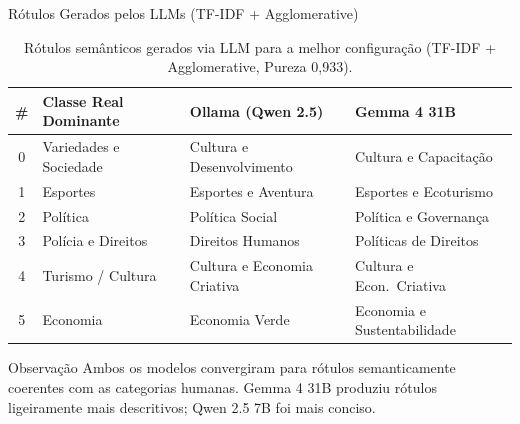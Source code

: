 \documentclass[aspectratio=169]{beamer}
\begin{document}
\begin{frame}{Rótulos Gerados pelos LLMs (TF-IDF + Agglomerative)}
  {\small
  \begin{table}
    \centering
    \setlength{\tabcolsep}{4pt}
    \renewcommand{\arraystretch}{1.2}
    \begin{tabular}{clll}
      \toprule
      \textbf{\#} & \textbf{Classe Real Dominante} &
      \textbf{Ollama (Qwen 2.5)} & \textbf{Gemma 4 31B}\\
      \midrule
      0 & Variedades e Sociedade & Cultura e Desenvolvimento   & Cultura e Capacitação\\
      1 & Esportes               & Esportes e Aventura          & Esportes e Ecoturismo\\
      2 & Política               & Política Social              & Política e Governança\\
      3 & Polícia e Direitos     & Direitos Humanos             & Políticas de Direitos\\
      4 & Turismo / Cultura      & Cultura e Economia Criativa  & Cultura e Econ.\ Criativa\\
      5 & Economia               & Economia Verde               & Economia e Sustentabilidade\\
      \bottomrule
    \end{tabular}
    \caption{\footnotesize Rótulos semânticos gerados via LLM para a melhor
             configuração (TF-IDF + Agglomerative, Pureza 0{,}933).}
  \end{table}
  }
  \vspace{-0.4em}
  \begin{block}{\small Observação}
    \small Ambos os modelos convergiram para rótulos semanticamente
    coerentes com as categorias humanas. Gemma 4 31B produziu rótulos
    ligeiramente mais descritivos; Qwen 2.5 7B foi mais conciso.
  \end{block}
\end{frame}
\end{document}
